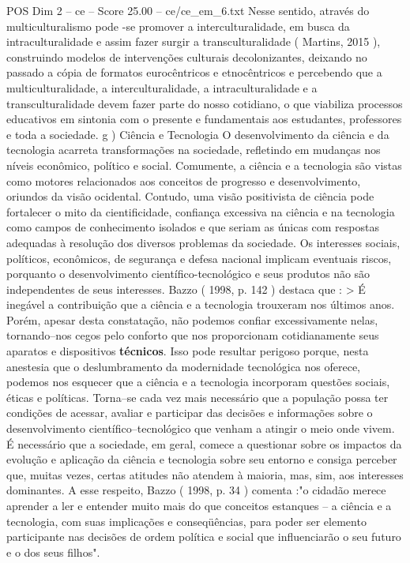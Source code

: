 \begin{textsample}{POS Dim 2 – ce – Score 25.00 – ce/ce\_em\_6.txt}
Nesse sentido, através do multiculturalismo pode -se promover a interculturalidade, em busca da intraculturalidade e assim fazer surgir a transculturalidade ( Martins, 2015 ), construindo modelos de intervenções culturais decolonizantes, deixando no passado a cópia de formatos eurocêntricos e etnocêntricos e percebendo que a multiculturalidade, a interculturalidade, a intraculturalidade e a transculturalidade devem fazer parte do nosso cotidiano, o que viabiliza processos educativos em sintonia com o presente e fundamentais aos estudantes, professores e toda a sociedade. g ) Ciência e Tecnologia O desenvolvimento da ciência e da tecnologia acarreta transformações na sociedade, refletindo em mudanças nos níveis econômico, político e social.
Comumente, a ciência e a tecnologia são vistas como motores relacionados aos conceitos de progresso e desenvolvimento, oriundos da visão ocidental.
Contudo, uma visão positivista de ciência pode fortalecer o mito da cientificidade, confiança excessiva na ciência e na tecnologia como campos de conhecimento isolados e que seriam as únicas com respostas adequadas à resolução dos diversos problemas da sociedade.
Os interesses sociais, políticos, econômicos, de segurança e defesa nacional implicam eventuais riscos, porquanto o desenvolvimento científico-tecnológico e seus produtos não são independentes de seus interesses.
Bazzo ( 1998, p. 142 ) destaca que : > É inegável a contribuição que a ciência e a tecnologia trouxeram nos últimos anos.
Porém, apesar desta constatação, não podemos confiar excessivamente nelas, tornando–nos cegos pelo conforto que nos proporcionam cotidianamente seus aparatos e dispositivos \textbf{técnicos}.
Isso pode resultar perigoso porque, nesta anestesia que o deslumbramento da modernidade tecnológica nos oferece, podemos nos esquecer que a ciência e a tecnologia incorporam questões sociais, éticas e políticas.
Torna–se cada vez mais necessário que a população possa ter condições de acessar, avaliar e participar das decisões e informações sobre o desenvolvimento científico–tecnológico que venham a atingir o meio onde vivem.
É necessário que a sociedade, em geral, comece a questionar sobre os impactos da evolução e aplicação da ciência e tecnologia sobre seu entorno e consiga perceber que, muitas vezes, certas atitudes não atendem à maioria, mas, sim, aos interesses dominantes.
A esse respeito, Bazzo ( 1998, p. 34 ) comenta :"o cidadão merece aprender a ler e entender muito mais do que conceitos estanques – a ciência e a tecnologia, com suas implicações e conseqüências, para poder ser elemento participante nas decisões de ordem política e social que influenciarão o seu futuro e o dos seus filhos".

\end{textsample}
